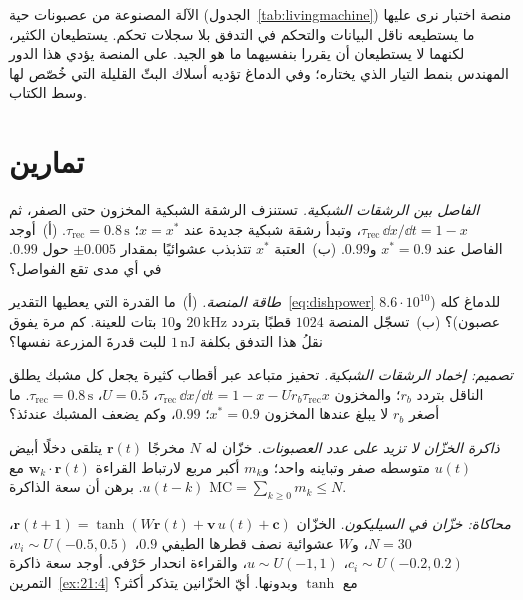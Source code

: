 الآلة المصنوعة من عصبونات حية (الجدول~\ref{tab:livingmachine}) منصة اختبار نرى عليها ما يستطيعه ناقل البيانات والتحكم في التدفق بلا سجلات تحكم. يستطيعان الكثير، لكنهما لا يستطيعان أن يقررا بنفسيهما ما هو الجيد. على المنصة يؤدي هذا الدور المهندس بنمط التيار الذي يختاره؛ وفي الدماغ تؤديه أسلاك البثّ القليلة التي خُصّص لها وسط الكتاب.

\section{تمارين}

\begin{exercise}[\lvlA]
\label{ex:21:1}
\emph{الفاصل بين الرشقات الشبكية.} تستنزف الرشقة الشبكية المخزون حتى الصفر، ثم $\tau_{\text{rec}}\,\dd x/\dd t=1-x$، وتبدأ رشقة شبكية جديدة عند $x=x^*$؛ $\tau_{\text{rec}}=0.8\,\text{s}$. (أ)~أوجد الفاصل عند $x^*=0.9$ و$0.99$. (ب)~العتبة $x^*$ تتذبذب عشوائيًا بمقدار $\pm0.005$ حول $0.99$. في أي مدى تقع الفواصل؟
\end{exercise}

\begin{exercise}[\lvlA]
\label{ex:21:2}
\emph{طاقة المنصة.} (أ)~ما القدرة التي يعطيها التقدير~\eqref{eq:dishpower} للدماغ كله ($8.6\cdot10^{10}$ عصبون)؟ (ب)~تسجّل المنصة $1024$ قطبًا بتردد $20\,\text{kHz}$ و$10$ بتات للعينة. كم مرة يفوق نقلُ هذا التدفق بكلفة $1\,\text{nJ}$ للبت قدرةَ المزرعة نفسها؟
\end{exercise}

\begin{exercise}[\lvlB]
\label{ex:21:3}
\emph{تصميم: إخماد الرشقات الشبكية.} تحفيز متباعد عبر أقطاب كثيرة يجعل كل مشبك يطلق الناقل بتردد $r_b$؛ والمخزون $\tau_{\text{rec}}\,\dd x/\dd t=1-x-Ur_b\tau_{\text{rec}}x$، $U=0.5$، $\tau_{\text{rec}}=0.8\,\text{s}$. ما أصغر $r_b$ لا يبلغ عندها المخزون $x^*=0.9$؛ $0.99$، وكم يضعف المشبك عندئذ؟
\end{exercise}

\begin{exercise}[\lvlB]
\label{ex:21:4}
\emph{ذاكرة الخزّان لا تزيد على عدد العصبونات.} خزّان له $N$ مخرجًا $\mathbf r(t)$ يتلقى دخلًا أبيض $u(t)$ متوسطه صفر وتباينه واحد؛ و$m_k$ أكبر مربع لارتباط القراءة $\mathbf w_k\cdot\mathbf r(t)$ مع $u(t-k)$. برهن أن سعة الذاكرة $\mathrm{MC}=\sum_{k\ge0}m_k\le N$.
\end{exercise}

\begin{exercise}[\lvlB]
\label{ex:21:5}
\emph{محاكاة: خزّان في السيليكون.} الخزّان $\mathbf r(t+1)=\tanh(W\mathbf r(t)+\mathbf v\,u(t)+\mathbf c)$، $N=30$، و$W$ عشوائية نصف قطرها الطيفي $0.9$، $v_i\sim U(-0.5,0.5)$، $c_i\sim U(-0.2,0.2)$، $u\sim U(-1,1)$، والقراءة انحدار حَرْفي. أوجد سعة ذاكرة التمرين~\ref{ex:21:4} مع $\tanh$ وبدونها. أيّ الخزّانين يتذكر أكثر؟
\end{exercise}

